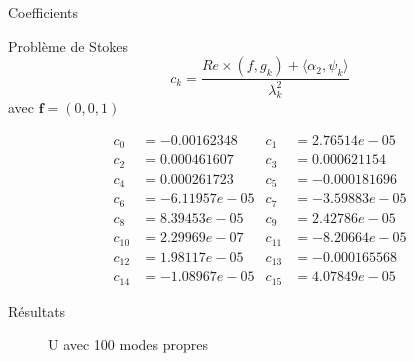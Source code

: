 \documentclass{beamer}
\begin{document}
\begin{frame}{Coefficients}
\begin{block}{Problème de Stokes}
\[
c_k = \frac{Re\times (f,g_k)+\langle \alpha_2,\psi_k\rangle}{\lambda_k^2}
\]
avec $\bm{f}=(0,0,1)$
\end{block}
\begin{align*}
c_{0} &= -0.00162348 & c_{1} &= 2.76514e-05\\
c_{2} &= 0.000461607 & c_{3} &= 0.000621154\\
c_{4} &= 0.000261723 & c_{5} &= -0.000181696\\
c_{6} &= -6.11957e-05 & c_{7} &= -3.59883e-05\\
c_{8} &= 8.39453e-05 & c_{9} &= 2.42786e-05\\
c_{10} &= 2.29969e-07 & c_{11} &= -8.20664e-05\\
c_{12} &= 1.98117e-05 & c_{13} &= -0.000165568\\
c_{14} &= -1.08967e-05 & c_{15} &= 4.07849e-05
\end{align*}
\end{frame}

\begin{frame}{Résultats}
\begin{figure}[H]
\caption{U avec 100 modes propres}
\end{figure}
\end{frame}
\end{document}
